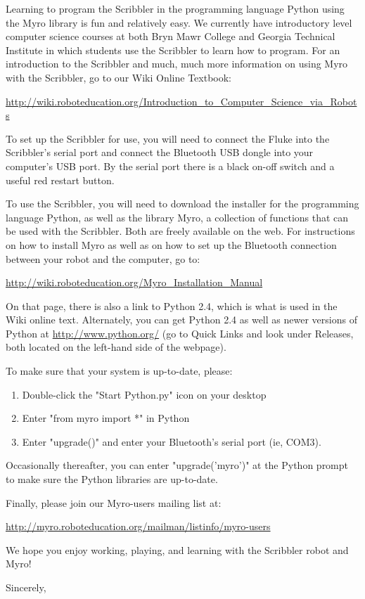 \documentclass{letter}[10pt]
\begin{document}
\begin{letter}{}
Learning to program the Scribbler in the programming language Python
using the Myro library is fun and relatively easy.  We currently have
introductory level computer science courses at both Bryn Mawr College
and Georgia Technical Institute in which students use the Scribbler to
learn how to program.  For an introduction to the Scribbler and much,
much more information on using Myro with the Scribbler, go to our Wiki
Online Textbook:

\url{http://wiki.roboteducation.org/Introduction_to_Computer_Science_via_Robots}

To set up the Scribbler for use, you will need to connect the Fluke
into the Scribbler's serial port and connect the Bluetooth USB dongle
into your computer's USB port.  By the serial port there is a black
on-off switch and a useful red restart button.

To use the Scribbler, you will need to download the installer for the
programming language Python, as well as the library Myro, a collection
of functions that can be used with the Scribbler.  Both are freely
available on the web.  For instructions on how to install Myro as well
as on how to set up the Bluetooth connection between your robot and
the computer, go to:

\url{http://wiki.roboteducation.org/Myro_Installation_Manual}

On that page, there is also a link to Python 2.4, which is what is
used in the Wiki online text.  Alternately, you can get Python 2.4 as
well as newer versions of Python at \url{http://www.python.org/} (go to
Quick Links and look under Releases, both located on the left-hand
side of the webpage).

To make sure that your system is up-to-date, please:

\begin{enumerate}
\item Double-click the "Start Python.py" icon on your desktop
\item  Enter "from myro import *" in Python
\item Enter "upgrade()" and enter your Bluetooth's serial port (ie, COM3).
\end{enumerate}

Occasionally thereafter, you can enter "upgrade('myro')" at the Python
prompt to make sure the Python libraries are up-to-date.

Finally, please join our Myro-users mailing list at:

\url{http://myro.roboteducation.org/mailman/listinfo/myro-users}

We hope you enjoy working, playing, and learning with the Scribbler
robot and Myro!


\closing{Sincerely,}

\end{letter}
\end{document}
